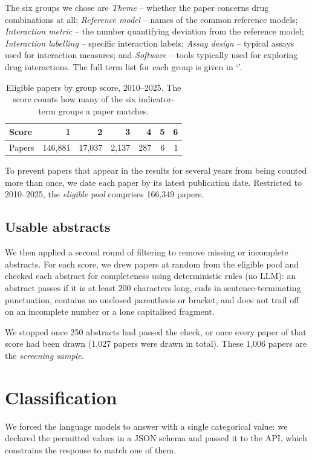 \documentclass[openacc]{rstb}
\begin{document}
The six groups we chose are \emph{Theme} -- whether the paper concerns drug combinations at all; \emph{Reference model} -- names of the common reference models; \emph{Interaction metric} -- the number quantifying deviation from the reference model; \emph{Interaction labelling} -- specific interaction labels; \emph{Assay design} -- typical assays used for interaction measures; and \emph{Software} -- tools typically used for exploring drug interactions.
The full term list for each group is given in `'.

\begin{table}[h]
  \centering\small
  \caption{Eligible papers by group score, 2010--2025.
  The score counts how many of the six indicator-term groups a paper matches.}
  \begin{tabular}{lrrrrrr}
    \hline
    Score  & 1 & 2 & 3 & 4 & 5 & 6 \\
    \hline
    Papers & 146{,}881 & 17{,}037 & 2{,}137 & 287 & 6 & 1 \\
    \hline
  \end{tabular}
\end{table}

To prevent papers that appear in the results for several years from being counted more than once, we date each paper by its latest publication date.
Restricted to 2010--2025, the \emph{eligible pool} comprises 166{,}349 papers.

\subsection{Usable abstracts}
\label{sec:usable-abstracts}
We then applied a second round of filtering to remove missing or incomplete abstracts.
For each score, we drew papers at random from the eligible pool and checked each abstract for completeness using deterministic rules (no LLM):
an abstract passes if it is at least 200 characters long, ends in sentence-terminating punctuation, contains no unclosed parenthesis or bracket, and does not trail off on an incomplete number or a lone capitalised fragment.

We stopped once 250 abstracts had passed the check, or once every paper of that score had been drawn (1{,}027 papers were drawn in total).
These 1{,}006 papers are the \emph{screening sample}.

\section{Classification}
We forced the language models to answer with a single categorical value: we declared the permitted values in a JSON schema and passed it to the API, which constrains the response to match one of them.
\end{document}
